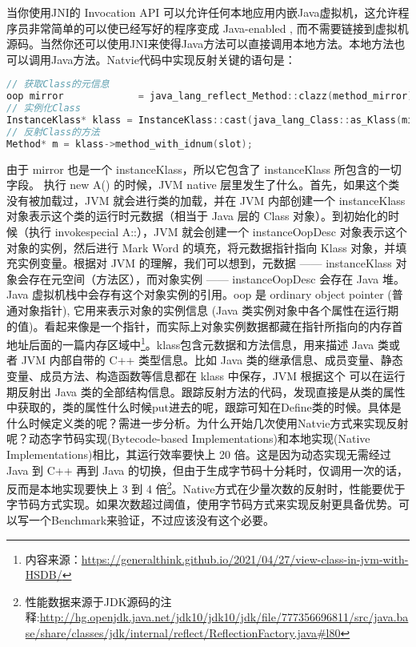 \documentclass[../../../interview-questions.tex]{subfiles}
\begin{document}
当你使用JNI的 Invocation API 可以允许任何本地应用内嵌Java虚拟机，这允许程序员非常简单的可以使已经写好的程序变成 Java-enabled , 而不需要链接到虚拟机源码。当然你还可以使用JNI来使得Java方法可以直接调用本地方法。本地方法也可以调用Java方法。Natvie代码中实现反射关键的语句是：

\begin{lstlisting}[language=C++]
// 获取Class的元信息
oop mirror             = java_lang_reflect_Method::clazz(method_mirror);
// 实例化Class
InstanceKlass* klass = InstanceKlass::cast(java_lang_Class::as_Klass(mirror));
// 反射Class的方法
Method* m = klass->method_with_idnum(slot);
\end{lstlisting}

由于 mirror 也是一个 instanceKlass，所以它包含了 instanceKlass 所包含的一切字段。
执行 new A() 的时候，JVM native 层里发生了什么。首先，如果这个类没有被加载过，JVM 就会进行类的加载，并在 JVM 内部创建一个 instanceKlass 对象表示这个类的运行时元数据（相当于 Java 层的 Class 对象）。到初始化的时候（执行 invokespecial A::），JVM 就会创建一个 instanceOopDesc 对象表示这个对象的实例，然后进行 Mark Word 的填充，将元数据指针指向 Klass 对象，并填充实例变量。根据对 JVM 的理解，我们可以想到，元数据 —— instanceKlass 对象会存在元空间（方法区），而对象实例 —— instanceOopDesc 会存在 Java 堆。Java 虚拟机栈中会存有这个对象实例的引用。oop 是 ordinary object pointer (普通对象指针), 它用来表示对象的实例信息 (Java 类实例对象中各个属性在运行期的值)。看起来像是一个指针，而实际上对象实例数据都藏在指针所指向的内存首地址后面的一篇内存区域中\footnote{内容来源：\url{https://generalthink.github.io/2021/04/27/view-class-in-jvm-with-HSDB/}}。klass包含元数据和方法信息，用来描述 Java 类或者 JVM 内部自带的 C++ 类型信息。比如 Java 类的继承信息、成员变量、静态变量、成员方法、构造函数等信息都在 klass 中保存，JVM 根据这个
可以在运行期反射出 Java 类的全部结构信息。跟踪反射方法的代码，发现直接是从类的属性中获取的，类的属性什么时候put进去的呢，跟踪可知在Define类的时候。具体是什么时候定义类的呢？需进一步分析。为什么开始几次使用Natvie方式来实现反射呢？动态字节码实现(Bytecode-based Implementations)和本地实现(Native Implementations)相比，其运行效率要快上 20 倍。这是因为动态实现无需经过 Java 到 C++ 再到 Java 的切换，但由于生成字节码十分耗时，仅调用一次的话，反而是本地实现要快上 3 到 4 倍\footnote{性能数据来源于JDK源码的注释:\url{http://hg.openjdk.java.net/jdk10/jdk10/jdk/file/777356696811/src/java.base/share/classes/jdk/internal/reflect/ReflectionFactory.java\#l80}}。Native方式在少量次数的反射时，性能要优于字节码方式实现。如果次数超过阈值，使用字节码方式来实现反射更具备优势。可以写一个Benchmark来验证，不过应该没有这个必要。
\end{document}
